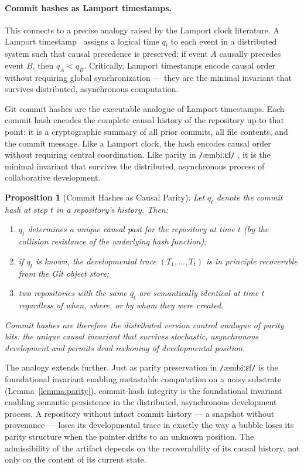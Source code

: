 \documentclass[11pt]{article}
\newcommand{\ambibf}{%
  \texttt{/}\textnormal{æmbiːɛf}\texttt{/}%
}
\newtheorem{proposition}[theorem]{Proposition}
\begin{document}
\paragraph{Commit hashes as Lamport timestamps.}
This connects to a precise analogy raised by the Lamport clock literature. A
Lamport timestamp~\cite{lamport1978} assigns a logical time $q_t$ to each
event in a distributed system such that causal precedence is preserved: if
event $A$ causally precedes event $B$, then $q_A < q_B$. Critically, Lamport
timestamps encode causal order without requiring global synchronization --- they
are the minimal invariant that survives distributed, asynchronous computation.

Git commit hashes are the executable analogue of Lamport timestamps. Each
commit hash encodes the complete causal history of the repository up to that
point: it is a cryptographic summary of all prior commits, all file contents,
and the commit message. Like a Lamport clock, the hash encodes causal order
without requiring central coordination. Like parity in \ambibf{}, it is the
minimal invariant that survives the distributed, asynchronous process of
collaborative development.

\begin{proposition}[Commit Hashes as Causal Parity]
Let $q_t$ denote the commit hash at step $t$ in a repository's history. Then:
\begin{enumerate}
\item $q_t$ determines a unique causal past for the repository at time $t$
(by the collision resistance of the underlying hash function);
\item if $q_t$ is known, the developmental trace $(T_1, \ldots, T_t)$ is
in principle recoverable from the Git object store;
\item two repositories with the same $q_t$ are semantically identical at
time $t$ regardless of when, where, or by whom they were created.
\end{enumerate}
Commit hashes are therefore the distributed version control analogue of
parity bits: the unique causal invariant that survives stochastic, asynchronous
development and permits dead reckoning of developmental position.
\end{proposition}

The analogy extends further. Just as parity preservation in \ambibf{} is
the foundational invariant enabling metastable computation on a noisy
substrate (Lemma~\ref{lemma:parity}), commit-hash integrity is the foundational
invariant enabling semantic persistence in the distributed, asynchronous
development process. A repository without intact commit history --- a snapshot
without provenance --- loses its developmental trace in exactly the way a
bubble loses its parity structure when the pointer drifts to an unknown
position. The admissibility of the artifact depends on the recoverability
of its causal history, not only on the content of its current state.
\end{document}
